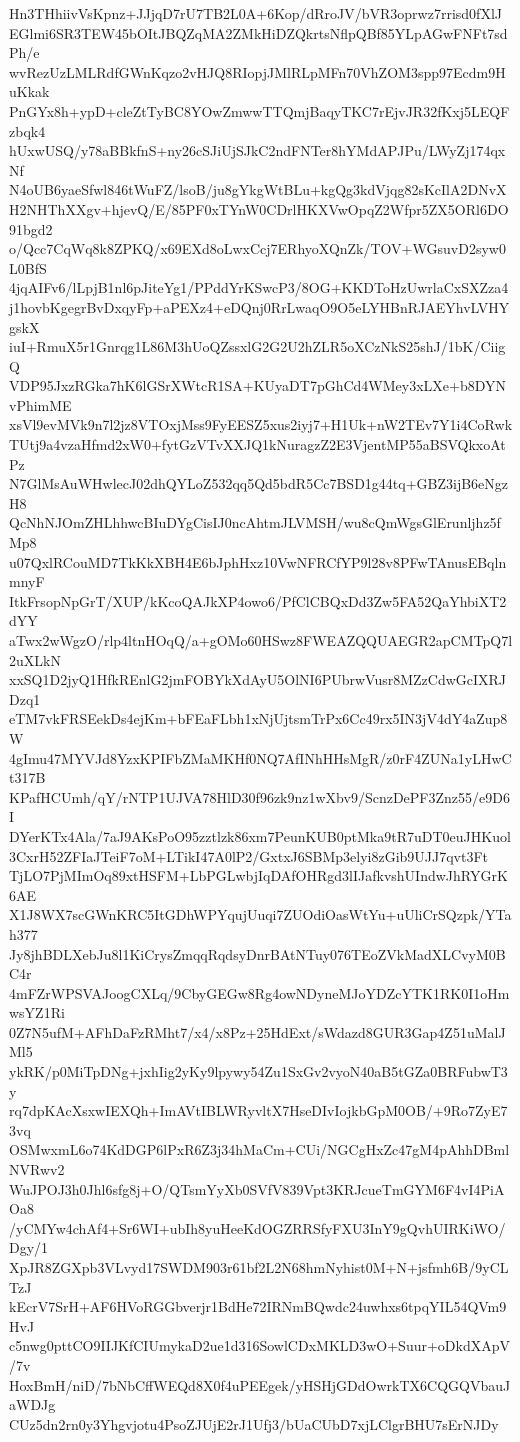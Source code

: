 Hn3THhiivVsKpnz+JJjqD7rU7TB2L0A+6Kop/dRroJV/bVR3oprwz7rrisd0fXlJ
EGlmi6SR3TEW45bOItJBQZqMA2ZMkHiDZQkrtsNflpQBf85YLpAGwFNFt7sdPh/e
wvRezUzLMLRdfGWnKqzo2vHJQ8RIopjJMlRLpMFn70VhZOM3spp97Ecdm9HuKkak
PnGYx8h+ypD+cleZtTyBC8YOwZmwwTTQmjBaqyTKC7rEjvJR32fKxj5LEQFzbqk4
hUxwUSQ/y78aBBkfnS+ny26cSJiUjSJkC2ndFNTer8hYMdAPJPu/LWyZj174qxNf
N4oUB6yaeSfwl846tWuFZ/lsoB/ju8gYkgWtBLu+kgQg3kdVjqg82sKcIlA2DNvX
H2NHThXXgv+hjevQ/E/85PF0xTYnW0CDrlHKXVwOpqZ2Wfpr5ZX5ORl6DO91bgd2
o/Qcc7CqWq8k8ZPKQ/x69EXd8oLwxCcj7ERhyoXQnZk/TOV+WGsuvD2syw0L0BfS
4jqAIFv6/lLpjB1nl6pJiteYg1/PPddYrKSwcP3/8OG+KKDToHzUwrlaCxSXZza4
j1hovbKgegrBvDxqyFp+aPEXz4+eDQnj0RrLwaqO9O5eLYHBnRJAEYhvLVHYgskX
iuI+RmuX5r1Gnrqg1L86M3hUoQZssxlG2G2U2hZLR5oXCzNkS25shJ/1bK/CiigQ
VDP95JxzRGka7hK6lGSrXWtcR1SA+KUyaDT7pGhCd4WMey3xLXe+b8DYNvPhimME
xsVl9evMVk9n7l2jz8VTOxjMss9FyEESZ5xus2iyj7+H1Uk+nW2TEv7Y1i4CoRwk
TUtj9a4vzaHfmd2xW0+fytGzVTvXXJQ1kNuragzZ2E3VjentMP55aBSVQkxoAtPz
N7GlMsAuWHwlecJ02dhQYLoZ532qq5Qd5bdR5Cc7BSD1g44tq+GBZ3ijB6eNgzH8
QcNhNJOmZHLhhwcBIuDYgCisIJ0ncAhtmJLVMSH/wu8cQmWgsGlErunljhz5fMp8
u07QxlRCouMD7TkKkXBH4E6bJphHxz10VwNFRCfYP9l28v8PFwTAnusEBqlnmnyF
ItkFrsopNpGrT/XUP/kKcoQAJkXP4owo6/PfClCBQxDd3Zw5FA52QaYhbiXT2dYY
aTwx2wWgzO/rlp4ltnHOqQ/a+gOMo60HSwz8FWEAZQQUAEGR2apCMTpQ7l2uXLkN
xxSQ1D2jyQ1HfkREnlG2jmFOBYkXdAyU5OlNI6PUbrwVusr8MZzCdwGcIXRJDzq1
eTM7vkFRSEekDs4ejKm+bFEaFLbh1xNjUjtsmTrPx6Cc49rx5IN3jV4dY4aZup8W
4gImu47MYVJd8YzxKPIFbZMaMKHf0NQ7AfINhHHsMgR/z0rF4ZUNa1yLHwCt317B
KPafHCUmh/qY/rNTP1UJVA78HlD30f96zk9nz1wXbv9/ScnzDePF3Znz55/e9D6I
DYerKTx4Ala/7aJ9AKsPoO95zztlzk86xm7PeunKUB0ptMka9tR7uDT0euJHKuol
3CxrH52ZFIaJTeiF7oM+LTikI47A0lP2/GxtxJ6SBMp3elyi8zGib9UJJ7qvt3Ft
TjLO7PjMImOq89xtHSFM+LbPGLwbjIqDAfOHRgd3lIJafkvshUIndwJhRYGrK6AE
X1J8WX7scGWnKRC5ItGDhWPYqujUuqi7ZUOdiOasWtYu+uUliCrSQzpk/YTah377
Jy8jhBDLXebJu8l1KiCrysZmqqRqdsyDnrBAtNTuy076TEoZVkMadXLCvyM0BC4r
4mFZrWPSVAJoogCXLq/9CbyGEGw8Rg4owNDyneMJoYDZcYTK1RK0I1oHmwsYZ1Ri
0Z7N5ufM+AFhDaFzRMht7/x4/x8Pz+25HdExt/sWdazd8GUR3Gap4Z51uMalJMl5
ykRK/p0MiTpDNg+jxhIig2yKy9lpywy54Zu1SxGv2vyoN40aB5tGZa0BRFubwT3y
rq7dpKAcXsxwIEXQh+ImAVtIBLWRyvltX7HseDIvIojkbGpM0OB/+9Ro7ZyE73vq
OSMwxmL6o74KdDGP6lPxR6Z3j34hMaCm+CUi/NGCgHxZc47gM4pAhhDBmlNVRwv2
WuJPOJ3h0Jhl6sfg8j+O/QTsmYyXb0SVfV839Vpt3KRJcueTmGYM6F4vI4PiAOa8
/yCMYw4chAf4+Sr6WI+ubIh8yuHeeKdOGZRRSfyFXU3InY9gQvhUIRKiWO/Dgy/1
XpJR8ZGXpb3VLvyd17SWDM903r61bf2L2N68hmNyhist0M+N+jsfmh6B/9yCLTzJ
kEcrV7SrH+AF6HVoRGGbverjr1BdHe72IRNmBQwdc24uwhxs6tpqYIL54QVm9HvJ
c5nwg0pttCO9IIJKfCIUmykaD2ue1d316SowlCDxMKLD3wO+Suur+oDkdXApV/7v
HoxBmH/niD/7bNbCffWEQd8X0f4uPEEgek/yHSHjGDdOwrkTX6CQGQVbauJaWDJg
CUz5dn2rn0y3Yhgvjotu4PsoZJUjE2rJ1Ufj3/bUaCUbD7xjLClgrBHU7sErNJDy
